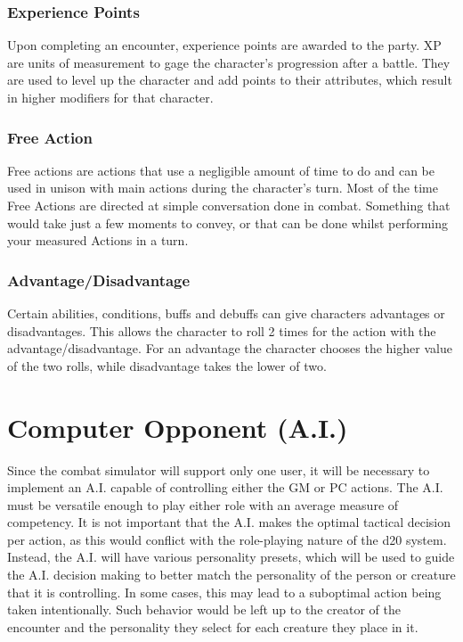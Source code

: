 \documentclass[12pt,a4paper]{report}
\begin{document}
			\subsubsection{Experience Points}
				Upon completing an encounter, experience points are awarded to the party. XP are units of measurement to gage the character's progression after a battle. They are used to level up the character and add points to their attributes, which result in higher modifiers for that character.
			\subsubsection{Free Action}
				Free actions are actions that use a negligible amount of time to do and can be used in unison with main actions during the character's turn. Most of the time Free Actions are directed at simple conversation done in combat. Something that would take just a few moments to convey, or that can be done whilst performing your measured Actions in a turn.
			\subsubsection{Advantage/Disadvantage}
				Certain abilities, conditions, buffs and debuffs can give characters advantages or disadvantages. This allows the character to roll 2 times for the action with the advantage/disadvantage. For an advantage the character chooses the higher value of the two rolls, while disadvantage takes the lower of two.
\newpage
\section{Computer Opponent (A.I.)}
	Since the combat simulator will support only one user, it will be necessary to implement an A.I. capable of controlling either the GM or PC actions. The A.I. must be versatile enough to play either role with an average measure of competency. It is not important that the A.I. makes the optimal tactical decision per action, as this would conflict with the role-playing nature of the d20 system. Instead, the A.I. will have various personality presets, which will be used to guide the A.I. decision making to better match the personality of the person or creature that it is controlling. In some cases, this may lead to a suboptimal action being taken intentionally. Such behavior would be left up to the creator of the encounter and the personality they select for each creature they place in it.
	
\end{document}
